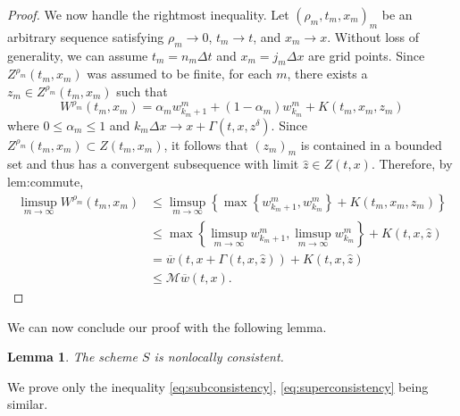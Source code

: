\documentclass[12pt]{article}
\newcounter{dummy}
\newtheorem{lemma}[dummy]{Lemma}
\begin{document}
\begin{proof}
We now handle the rightmost inequality. Let
$(\rho_{m},t_{m},x_{m})_{m}$ be an arbitrary sequence satisfying
$\rho_{m}\rightarrow0$, $t_{m}\rightarrow t$, and $x_{m}\rightarrow x$.
Without loss of generality, we can assume $t_{m}=n_{m}\Delta t$ and
$x_{m}=j_{m}\Delta x$ are grid points. Since $Z^{\rho_{m}}(t_{m},x_{m})$
was assumed to be finite, for each $m$, there exists a $z_{m}\in Z^{\rho_{m}}(t_{m},x_{m})$
such that
\[
W^{\rho_{m}}(t_{m},x_{m})=\alpha_{m}w_{k_{m}+1}^{m}+(1-\alpha_{m})w_{k_{m}}^{m}+K(t_{m},x_{m},z_{m})
\]
where $0{\leqslant}\alpha_{m}{\leqslant}1$ and $k_{m}\Delta x\rightarrow x+\Gamma(t,x,z^{\delta})$.
Since $Z^{\rho_{m}}(t_{m},x_{m})\subset Z(t_{m},x_{m})$, it follows
that $(z_{m})_{m}$ is contained in a bounded set and thus has a convergent
subsequence with limit $\hat{z}\in Z(t,x)$. Therefore, by {\prettyref}{lem:commute},
\begin{align*}
\limsup_{m\rightarrow\infty}W^{\rho_{m}}(t_{m},x_{m}) & {\leqslant}\limsup_{m\rightarrow\infty}\left\{ \max\left\{ w_{k_{m}+1}^{m},w_{k_{m}}^{m}\right\} +K(t_{m},x_{m},z_{m})\right\} \\
 & {\leqslant}\max\left\{ \limsup_{m\rightarrow\infty}w_{k_{m}+1}^{m},\limsup_{m\rightarrow\infty}w_{k_{m}}^{m}\right\} +K(t,x,\hat{z})\\
 & =\overline{w}(t,x+\Gamma(t,x,\hat{z}))+K(t,x,\hat{z})\\
 & {\leqslant}\mathcal{M}\overline{w}(t,x).{}
\end{align*}
\end{proof}
We can now conclude our proof with the following lemma.
\begin{lemma}
\label{lem:nonlocal_consistency}The scheme $S$ is nonlocally consistent.
\end{lemma}
We prove only the inequality \eqref{eq:subconsistency}, \eqref{eq:superconsistency}
being similar.
\end{document}
